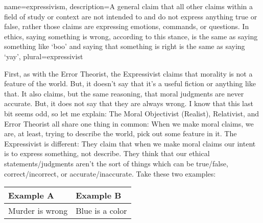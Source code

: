 {
  name=expressivism,
  description={A general claim that all other claims within a field of study or context are not intended to and do not express anything true or false, rather those claims are expressing emotions, commands, or questions. In ethics, saying something is wrong, according to this stance, is the same as saying something like `boo' and saying that something is right is the same as saying `yay'},
plural=expressivist
}


First, as with the Error Theorist, the Expressivist claims that morality is not a feature of the world. But, it doesn't say that it's a useful fiction or anything like that. It also claims, but the same reasoning, that moral judgments are never accurate. But, it does not say that they are always wrong. I know that this last bit seems odd, so let me explain: The Moral Objectivist (Realist), Relativist, and Error Theorist all share one thing in common: When we make moral claims, we are, at least, trying to describe the world, pick out some feature in it. The Expressivist is different: They claim that when we make moral claims our intent is to express something, not describe. They think that our ethical statements/judgments aren't the sort of things which can be true/false, correct/incorrect, or accurate/inaccurate. Take these two examples: 
\noindent
\begin{tabular}{p{2.75in}|p{2.75in}}
Example A&Example B\\\hline
    Murder is wrong&Blue is a color
\end{tabular}

